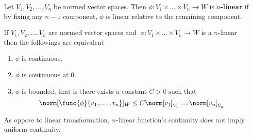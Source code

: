 \begin{definition}
    Let \(V_1, V_2 ,\dots , V_n\) be  normed vector spaces. Then \(\phi : V_1 \times \dots \times V_n \to W\) is \textbf{\(n\)-linear} if by fixing any \(n-1\) component, \(\phi\) is linear relative to the remaining component.
\end{definition}

\begin{proposition}
    If \(V_1, V_2, \dots , V_n\) are  normed vector spaces and \(\ \phi : V_1 \times \dots \times V_n \to W \) is a \(n\)-linear then the followings are equivalent
    \begin{enumerate}
        \item \(\phi\) is continuous. \label{it:nLP_1}
        \item \(\phi\) is continuous at 0. \label{it:nLP_2}
        \item \(\phi\) is bounded, that is there exists a constant \(C > 0\) such that \label{it:nLP_3}
              \begin{equation*}
                  \norm[\func{\phi}{v_1, \dots ,v_n}]_W \leq C \norm[v_1]_{V_1} \dots \norm[v_n]_{V_n}
              \end{equation*}
    \end{enumerate}
\end{proposition}

\begin{remark}
    As oppose to linear transformation, \(n\)-linear function's continuity does not imply uniform continuity.
\end{remark}

